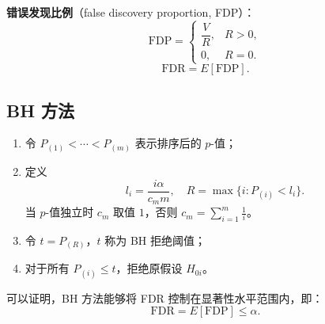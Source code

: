 \documentclass[11pt,a4paper]{report}
\theoremstyle{definition}
\begin{document}
\textbf{错误发现比例}（false discovery proportion, FDP）：
\[
\mathrm{FDP}=\begin{cases}
\dfrac{V}{R}, & R>0,\\[0.5em]
0, & R=0.
\end{cases}
\]
\[
\mathrm{FDR}=E[\mathrm{FDP}].
\]

\subsection{BH 方法}

\begin{enumerate}[label=\arabic*.,leftmargin=2em]
    \item 令 $P_{(1)}<\cdots<P_{(m)}$ 表示排序后的 $p$-值；
    \item 定义
    \[
    l_{i}=\frac{i\alpha}{c_{m}m},\quad R=\max\{i\colon P_{(i)}<l_{i}\}.
    \]
    当 $p$-值独立时 $c_{m}$ 取值 $1$，否则 $c_{m}=\sum_{i=1}^{m}\frac{1}{i}$。
    \item 令 $t=P_{(R)}$，$t$ 称为 BH 拒绝阈值；
    \item 对于所有 $P_{(i)}\leq t$，拒绝原假设 $H_{0i}$。
\end{enumerate}

可以证明，BH 方法能够将 FDR 控制在显著性水平范围内，即：
\[
\mathrm{FDR}=E[\mathrm{FDP}]\leq\alpha.
\]
\end{document}
